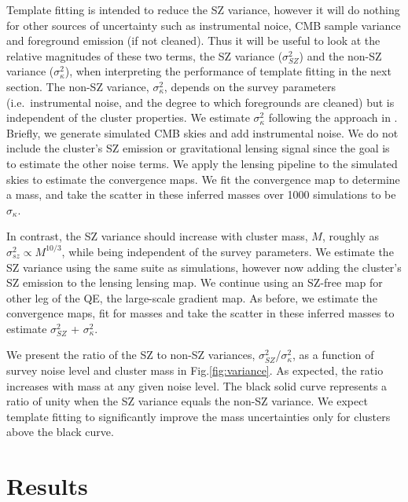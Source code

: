 {Template fitting is intended to reduce the SZ variance, however it will do nothing for other sources of uncertainty such as instrumental noice, CMB sample variance and foreground emission (if not cleaned). 
Thus it will be useful to look at the relative magnitudes of these two terms, the SZ variance ($\sigma_{SZ}^{2}$) and the non-SZ variance ($\sigma_{\kappa}^{2}$), when interpreting the performance of template fitting in the next section.
The non-SZ variance, $\sigma_{\kappa}^{2}$, depends on the survey parameters (i.e.~instrumental noise, and the degree to which foregrounds are cleaned) but is independent of the cluster properties. 
We estimate $\sigma_{\kappa}^{2}$ following the approach in \citet{raghunathan18}. 
Briefly, we generate simulated CMB skies and add instrumental noise. 
We do not include the cluster's SZ emission or gravitational lensing signal since the goal is to estimate the other noise terms. 
We apply the lensing pipeline to the simulated skies to estimate the convergence maps. 
We fit the convergence map  to determine  a mass, and take the scatter in these inferred masses over 1000 simulations to be $\sigma_{\kappa}$. 

In contrast, the SZ variance should increase with cluster mass, $M$, roughly as $\sigma_{sz}^2 \propto M^{10/3}$, while being independent of the survey parameters. 
We estimate the SZ variance using the same suite as simulations, however now adding the cluster's SZ emission to the lensing lensing map. 
We continue using an SZ-free map for other leg of the QE, the large-scale gradient map. 
As before, we estimate the convergence maps, fit for masses and take the scatter in these inferred masses to estimate $\sigma_{SZ}^{2}$ + $\sigma_{\kappa}^{2}$.

We present the ratio of the SZ to non-SZ variances, $\sigma_{SZ}^{2}$/$\sigma_{\kappa}^{2}$, as a function of survey noise level and cluster mass in Fig.\ref{fig:variance}.  
As expected, the ratio increases with mass at any given noise level. 
The black solid curve represents a ratio of unity when the SZ variance equals the non-SZ variance. 
We expect template fitting to significantly improve the mass uncertainties only for clusters above the black curve. 

\section{Results}
\label{sec_results}

}
